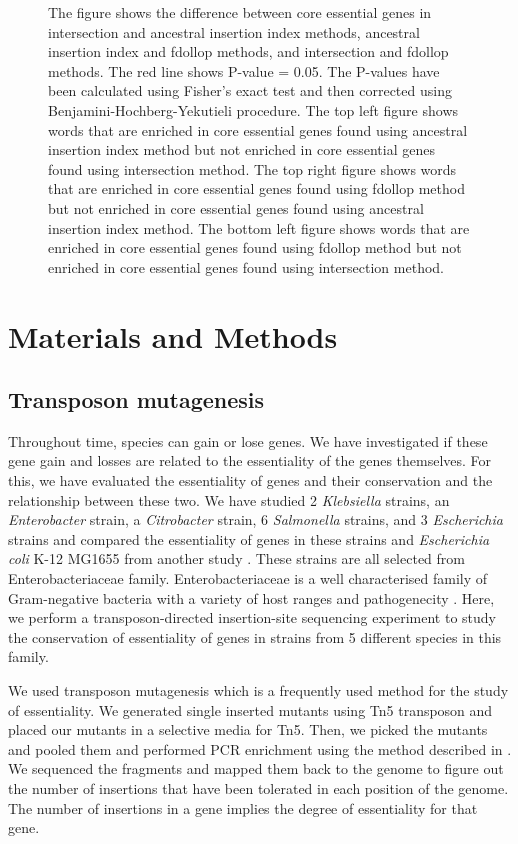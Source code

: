 \documentclass[12pt,letterpaper]{article}
\begin{document}
\begin{figure}
\caption{The figure shows the difference between core essential genes in intersection and ancestral insertion index methods, ancestral insertion index and fdollop methods, and intersection and fdollop methods. The red line shows P-value = 0.05. The P-values have been calculated using Fisher's exact test and then corrected using Benjamini-Hochberg-Yekutieli procedure. The top left figure shows words that are enriched in core essential genes found using ancestral insertion index method but not enriched in core essential genes found using intersection method. The top right figure shows words that are enriched in core essential genes found using fdollop method but not enriched in core essential genes found using ancestral insertion index method. The bottom left figure shows words that are enriched in core essential genes found using fdollop method but not enriched in core essential genes found using intersection method.}
\label{fig:method-difference}
\end{figure}

\section{Materials and Methods}
\subsection{Transposon mutagenesis}
Throughout time, species can gain or lose genes. We have investigated if these gene gain and losses are related to the essentiality of the genes themselves. For this, we have evaluated the essentiality of genes and their conservation and the relationship between these two. We have studied 2 \textit{Klebsiella} strains, an \textit{Enterobacter} strain, a \textit{Citrobacter} strain, 6 \textit{Salmonella} strains, and 3 \textit{Escherichia} strains and compared the essentiality of genes in these strains and \textit{Escherichia coli} K-12 MG1655 from another study \cite{baba_construction_2006}. These strains are all selected from Enterobacteriaceae family. Enterobacteriaceae is a well characterised family of Gram-negative bacteria with a variety of host ranges and pathogenecity \cite{brenner_bergeys_2006}. Here, we perform a transposon-directed insertion-site sequencing experiment to study the conservation of essentiality of genes in strains from 5 different species in this family.

We used transposon mutagenesis which is a frequently used method for the study of essentiality. We generated single inserted mutants using Tn5 transposon and placed our mutants in a selective media for Tn5. Then, we picked the mutants and pooled them and performed PCR enrichment using the method described in \cite{barquist_tradis_2016}. We sequenced the fragments and mapped them back to the genome to figure out the number of insertions that have been tolerated in each position of the genome. The number of insertions in a gene implies the degree of essentiality for that gene.
\end{document}

